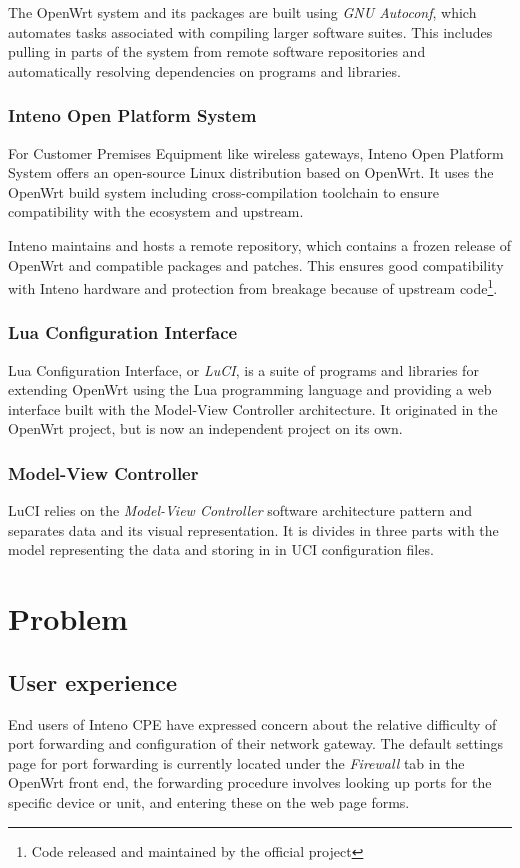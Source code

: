 \documentclass[a4paper,11pt]{kth-bcs}
\begin{document}
The OpenWrt system and its packages are built using \emph{GNU Autoconf}, which automates tasks associated with compiling larger software suites.
This includes pulling in parts of the system from remote software repositories and automatically resolving dependencies on programs and libraries.

\subsection{Inteno Open Platform System}
For Customer Premises Equipment like wireless gateways, Inteno Open Platform System offers an open-source Linux distribution based on OpenWrt.
It uses the OpenWrt build system including cross-compilation toolchain to ensure compatibility with the ecosystem and upstream.

Inteno maintains and hosts a remote repository, which contains a frozen release of OpenWrt and compatible packages and patches.
This ensures good compatibility with Inteno hardware and protection from breakage because of upstream code\footnote{Code released and maintained by the official project}.

\subsection{Lua Configuration Interface}
Lua Configuration Interface, or \emph{LuCI}, is a suite of programs and libraries for extending OpenWrt using the Lua programming language and providing a web interface built with the Model-View Controller architecture.
It originated in the OpenWrt project, but is now an independent project on its own.


\subsection{Model-View Controller}
LuCI relies on the \emph{Model-View Controller} software architecture pattern and separates data and its visual representation.
It is divides in three parts with the model representing the data and storing in in UCI configuration files.

\chapter{Problem}
   \section{User experience}
End users of Inteno CPE have expressed concern about the relative difficulty of port forwarding and configuration of their network gateway.
The default settings page for port forwarding is currently located under the \emph{Firewall} tab in the OpenWrt front end, the forwarding procedure involves looking up ports for the specific device or unit, and entering these on the web page forms.
\end{document}
